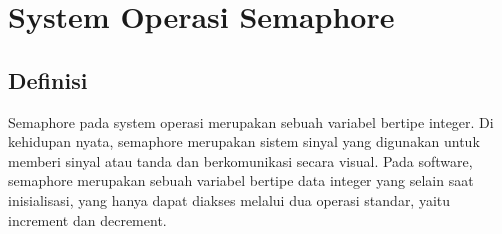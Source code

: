 \section{System Operasi Semaphore}
\subsection{Definisi}
Semaphore pada system operasi merupakan sebuah variabel bertipe integer. Di kehidupan nyata, semaphore merupakan sistem sinyal yang digunakan untuk memberi 
sinyal atau tanda dan berkomunikasi secara visual. Pada software, semaphore merupakan sebuah variabel bertipe data integer yang selain saat inisialisasi, yang 
hanya dapat diakses melalui dua operasi standar, yaitu increment dan decrement.

